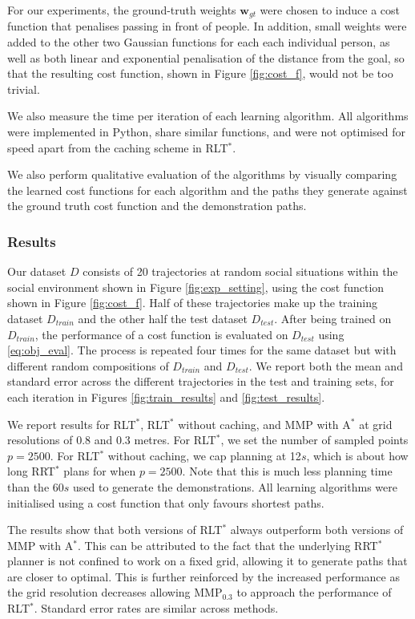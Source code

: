 \documentclass[a4paper,11pt]{report}
\begin{document}
For our experiments, the ground-truth weights $\mathbf{w}_{gt}$ were chosen to induce a cost function that penalises passing in front of people. In addition, small weights were added to the other two Gaussian functions for each each individual person, as well as both linear and exponential penalisation of the distance from the goal, so that the resulting cost function, shown in Figure \ref{fig:cost_f}, would not be too trivial. 

We also measure the time per iteration of each learning algorithm.  All algorithms were implemented in Python, share similar functions, and were not optimised for speed apart from the caching scheme in RLT$^*$.

	We also perform qualitative evaluation of the algorithms by visually comparing the learned cost functions for each algorithm and the paths they generate against the ground truth cost function and the demonstration paths.

	\subsubsection{Results}

	Our dataset $D$ consists of 20 trajectories at random social situations within the social environment shown in Figure \ref{fig:exp_setting}, using the cost function shown in Figure \ref{fig:cost_f}. Half of these trajectories make up the training dataset $D_{train}$ and the other half the test dataset $D_{test}$. After being trained on $D_{train}$, the performance of a cost function is evaluated on $D_{test}$ using \eqref{eq:obj_eval}. The process is repeated four times for the same dataset but with different random compositions of $D_{train}$ and $D_{test}$. We report both the mean and standard error across the different trajectories in the test and training sets, for each iteration in Figures \ref{fig:train_results} and \ref{fig:test_results}. 

We report results for RLT$^*$, RLT$^*$ without caching, and MMP with A$^*$ at grid resolutions of 0.8 and 0.3 metres.  For RLT$^*$, we set the number of sampled points $p=2500$. For RLT$^*$ without 
caching, we cap planning at 12$s$, which is about how long RRT$^*$ plans for when $p=2500$.  Note 
that this is much less planning time than the 60$s$ used to generate the demonstrations.
 All learning algorithms were initialised using a cost function that only favours shortest paths.

The results show that both versions of RLT$^*$ always outperform both versions of MMP with A$^*$. This can be attributed to the fact that the underlying RRT$^*$ planner is not confined to work on a fixed grid, allowing it to generate paths that are closer to optimal. This is further reinforced by the increased performance as the grid resolution decreases allowing MMP$_{0.3}$ to approach the performance of RLT$^*$. Standard error rates are similar across methods.
\end{document}
